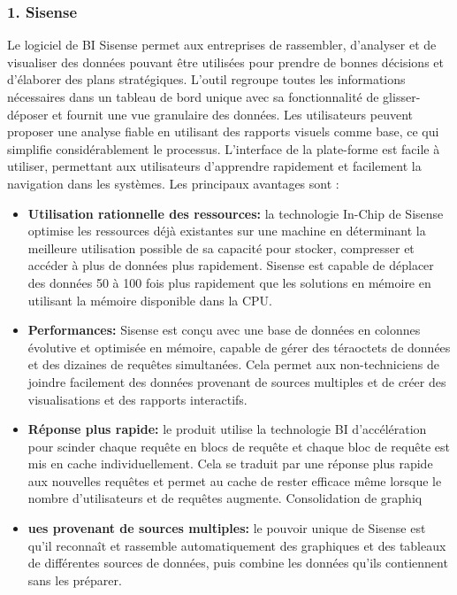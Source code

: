 \documentclass[french, a4paper, 12pt]{report}
\begin{document}
\subsubsection{1. Sisense}
Le logiciel de BI Sisense permet aux entreprises de rassembler, d’analyser et de visualiser des données pouvant être utilisées pour prendre de bonnes décisions et d’élaborer des plans stratégiques. L'outil regroupe toutes les informations nécessaires dans un tableau de bord unique avec sa fonctionnalité de glisser-déposer et fournit une vue granulaire des données. Les utilisateurs peuvent proposer une analyse fiable en utilisant des rapports visuels comme base, ce qui simplifie considérablement le processus. L’interface de la plate-forme est facile à utiliser, permettant aux utilisateurs d’apprendre rapidement et facilement la navigation dans les systèmes. Les principaux avantages sont :
\begin{itemize}
\item \textbf{Utilisation rationnelle des ressources:}  la technologie In-Chip de Sisense optimise les ressources déjà existantes sur une machine en déterminant la meilleure utilisation possible de sa capacité pour stocker, compresser et accéder à plus de données plus rapidement. Sisense est capable de déplacer des données 50 à 100 fois plus rapidement que les solutions en mémoire en utilisant la mémoire disponible dans la CPU.
\item \textbf{Performances:}  Sisense est conçu avec une base de données en colonnes évolutive et optimisée en mémoire, capable de gérer des téraoctets de données et des dizaines de requêtes simultanées. Cela permet aux non-techniciens de joindre facilement des données provenant de sources multiples et de créer des visualisations et des rapports interactifs.
\item \textbf{ Réponse plus rapide:} le produit utilise la technologie BI d'accélération pour scinder chaque requête en blocs de requête et chaque bloc de requête est mis en cache individuellement. Cela se traduit par une réponse plus rapide aux nouvelles requêtes et permet au cache de rester efficace même lorsque le nombre d'utilisateurs et de requêtes augmente.
Consolidation de graphiq
\item \textbf{ues provenant de sources multiples:}  le pouvoir unique de Sisense est qu’il reconnaît et rassemble automatiquement des graphiques et des tableaux de différentes sources de données, puis combine les données qu’ils contiennent sans les préparer.
\end{itemize} 
\end{document}
